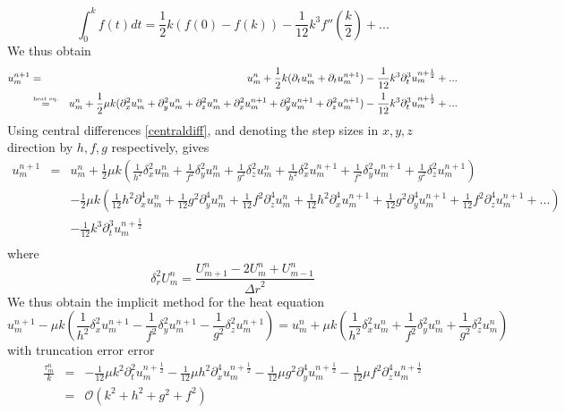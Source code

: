 \begin{equation}
\int_0^k f(t) dt = \frac{1}{2} k (f(0) - f(k)) -\frac{1}{12} k^3 f''(\frac{k}{2}) + ...
\label{trapezoidalrule}
\end{equation}
We thus obtain
\begin{eqnarray}
\label{res}
u_m^ {n+1} &=& u_m^ n + \frac{1}{2} k(\partial_t u_m^n + \partial_t u_m^{n+1}) - \frac{1}{12} k^3 \partial_t ^3 u_m^{n+\frac{1}{2}} + ...\\
&\stackrel{\text{\tiny heat eq.}}{=}& u_m^ n + \frac{1}{2} \mu k(\partial_x^2 u_m^n + \partial_y^2 u_m^n + \partial_z^2 u_m^n + \partial_x^2 u_m^{n+1} + \partial_y^2 u_m^{n+1} + \partial_z^2 u_m^{n+1}) - \frac{1}{12} k^3 \partial_t ^3    u_m^{n+\frac{1}{2}} + ... \nonumber
\end{eqnarray}
Using central differences \cref{centraldiff}, and denoting the step sizes in $x, y, z$ direction by $h, f, g$ respectively, gives
\begin{eqnarray*}
u_m^{n+1} &=& u_m^ n + \frac{1}{2} \mu k(\frac{1}{h^2}\delta_x^2 u_m^n + \frac{1}{f^2}\delta_y^2 u_m^n + \frac{1}{g^2}\delta_z^2 u_m^n + \frac{1}{h^2}\delta_x^2 u_m^{n+1} + \frac{1}{f^2}\delta_y^2 u_m^{n+1} + \frac{1}{g^2}\delta_z^2 u_m^{n+1}) \\
  &&- \frac{1}{2} \mu k (\frac{1}{12}h^2\partial_x^4 u_m^n + \frac{1}{12}g^2\partial_y^4 u_m^n + \frac{1}{12}f^2\partial_z^4 u_m^n + \frac{1}{12}h^2\partial_x^4 u_m^{n+1} + \frac{1}{12}g^2\partial_y^4 u_m^{n+1} + \frac{1}{12}f^2\partial_z^4 u_m^{n+1} + ...) \\
  &&- \frac{1}{12} k^3 \partial_t ^3 u_m^{n+\frac{1}{2}} \\ 
\end{eqnarray*}
where
\begin{equation}
\delta_{r}^{2}U_m^{n}=\frac{U_{m+1}^{n}-2U_m^{n}+U_{m-1}^{n}}{{\Delta r}^{2}}
\label{centraldiff}
\end{equation}
We thus obtain the implicit method for the heat equation
\begin{equation}
u_m^{n+1}-\mu k(\frac{1}{h^2}\delta_x^2 u_m^{n+1}-\frac{1}{f^2}\delta_y^2 u_m^{n+1}-\frac{1}{g^2}\delta_z^2 u_m^{n+1})=u_m^n + \mu k(\frac{1}{h^2}\delta_x^2 u_m^n + \frac{1}{f^2}\delta_y^2 u_m^n +\frac{1}{g^2}\delta_z^2 u_m^n)
\label{crank}
\end{equation}
with truncation error error
\begin{eqnarray}
\frac{\tau_m^ n}{k} &=& -\frac{1}{12} \mu k^2 \partial_t^2 u_m^{n+\frac{1}{2}} - \frac{1}{12} \mu h^2 \partial_x^4 u_m^{n+\frac{1}{2}} - \frac{1}{12} \mu g^2 \partial_y^4 u_m^{n+\frac{1}{2}} - \frac{1}{12} \mu f^2 \partial_z^4 u_m^{n+\frac{1}{2}}\\
&=& \mathcal{O} (k^2 + h^2 + g^2 + f^2)
\label{truncerror}
\end{eqnarray}

